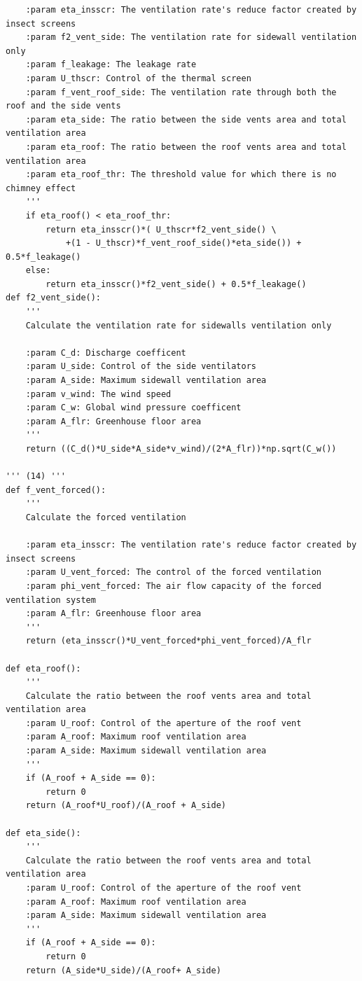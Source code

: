 \documentclass[a4paper]{article}
\begin{document}
\begin{appendices}
\begin{verbatim}
    :param eta_insscr: The ventilation rate's reduce factor created by insect screens
    :param f2_vent_side: The ventilation rate for sidewall ventilation only
    :param f_leakage: The leakage rate
    :param U_thscr: Control of the thermal screen
    :param f_vent_roof_side: The ventilation rate through both the roof and the side vents
    :param eta_side: The ratio between the side vents area and total ventilation area
    :param eta_roof: The ratio between the roof vents area and total ventilation area
    :param eta_roof_thr: The threshold value for which there is no chimney effect
    '''
    if eta_roof() < eta_roof_thr:
        return eta_insscr()*( U_thscr*f2_vent_side() \
            +(1 - U_thscr)*f_vent_roof_side()*eta_side()) + 0.5*f_leakage()
    else:
        return eta_insscr()*f2_vent_side() + 0.5*f_leakage()
def f2_vent_side():
    '''
    Calculate the ventilation rate for sidewalls ventilation only

    :param C_d: Discharge coefficent
    :param U_side: Control of the side ventilators
    :param A_side: Maximum sidewall ventilation area
    :param v_wind: The wind speed
    :param C_w: Global wind pressure coefficent
    :param A_flr: Greenhouse floor area
    '''
    return ((C_d()*U_side*A_side*v_wind)/(2*A_flr))*np.sqrt(C_w())

''' (14) '''
def f_vent_forced():
    '''
    Calculate the forced ventilation

    :param eta_insscr: The ventilation rate's reduce factor created by insect screens
    :param U_vent_forced: The control of the forced ventilation
    :param phi_vent_forced: The air flow capacity of the forced ventilation system
    :param A_flr: Greenhouse floor area
    '''
    return (eta_insscr()*U_vent_forced*phi_vent_forced)/A_flr

def eta_roof():
    '''
    Calculate the ratio between the roof vents area and total ventilation area
    :param U_roof: Control of the aperture of the roof vent
    :param A_roof: Maximum roof ventilation area
    :param A_side: Maximum sidewall ventilation area
    '''
    if (A_roof + A_side == 0):
        return 0
    return (A_roof*U_roof)/(A_roof + A_side) 

def eta_side():
    '''
    Calculate the ratio between the roof vents area and total ventilation area
    :param U_roof: Control of the aperture of the roof vent
    :param A_roof: Maximum roof ventilation area
    :param A_side: Maximum sidewall ventilation area
    '''
    if (A_roof + A_side == 0):
        return 0
    return (A_side*U_side)/(A_roof+ A_side)


\end{verbatim}
\end{appendices}
\end{document}
